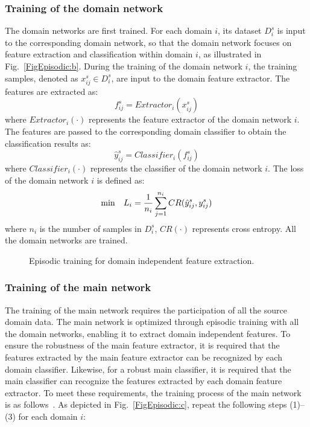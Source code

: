 \documentclass[journal]{IEEEtran}
\begin{document}
\subsubsection{Training of the domain network}
The domain networks are first trained. For each domain $i$, its dataset $D_i^s$ is input to the corresponding domain network, so that the domain network focuses on feature extraction and classification within domain $i$, as illustrated in Fig.~\ref{FigEpisodic:b}. During the training of the domain network $i$, the training samples, denoted as $x_{ij}^{s} \in D_i^s$, are input to the domain feature extractor. The features are extracted as:
\begin{equation}
    f_{ij}^{s} = Extractor_i(x_{ij}^{s})
\end{equation}
where $Extractor_i(\cdot)$ represents the feature extractor of the domain network $i$. The features are passed to the corresponding domain classifier to obtain the classification results as:
\begin{equation}
    \hat{y}_{ij}^{s} = Classifier_i(f_{ij}^{s})
\end{equation}
where $Classifier_i(\cdot)$ represents the classifier of the domain network $i$. The loss of the domain network $i$ is defined as:
\begin{equation}
    {\rm min} \quad L_i = \frac{1}{n_i}\sum_{j=1}^{n_i}CR(\hat{y}_{ij}^{s}, y_{ij}^{s})
\end{equation}
where $n_i$ is the number of samples in $D_i^s$, $CR(\cdot)$ represents cross entropy. All the domain networks are trained.

\begin{figure*}
    \centering
		\hspace{0.0cm}
		\hspace{0.0cm}
\caption{Episodic training for domain independent feature extraction.}
\label{FigEpisodic}
\end{figure*}

\subsubsection{Training of the main network}
The training of the main network requires the participation of all the source domain data. The main network is optimized through episodic training with all the domain networks, enabling it to extract domain independent features. To ensure the robustness of the main feature extractor, it is required that the features extracted by the main feature extractor can be recognized by each domain classifier. Likewise, for a robust main classifier, it is required that the main classifier can recognize the features extracted by each domain feature extractor. To meet these requirements, the training process of the main network is as follows~\cite{LiD:2019}. As depicted in Fig.~\ref{FigEpisodic:c}, repeat the following steps (1)--(3) for each domain $i$:
\end{document}
